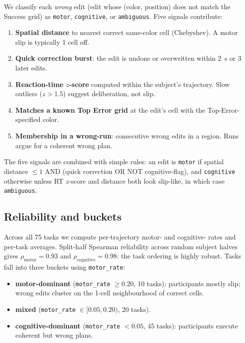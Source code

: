 \documentclass[11pt]{article}
\begin{document}
We classify each \emph{wrong} edit (edit whose (color, position)
does not match the Success grid) as \texttt{motor},
\texttt{cognitive}, or \texttt{ambiguous}. Five signals contribute:

\begin{enumerate}[leftmargin=*, topsep=2pt, itemsep=1pt]
  \item \textbf{Spatial distance} to nearest correct
        same-color cell (Chebyshev). A motor slip is typically 1
        cell off.
  \item \textbf{Quick correction burst}: the edit is undone or
        overwritten within 2~s or 3 later edits.
  \item \textbf{Reaction-time $z$-score} computed within the
        subject's trajectory. Slow outliers ($z > 1.5$) suggest
        deliberation, not slip.
  \item \textbf{Matches a known Top Error grid} at the edit's
        cell with the Top-Error-specified color.
  \item \textbf{Membership in a wrong-run}: consecutive wrong
        edits in a region. Runs argue for a coherent wrong plan.
\end{enumerate}

The five signals are combined with simple rules: an edit is
\texttt{motor} if spatial distance $\leq 1$ AND (quick correction OR
NOT cognitive-flag), and \texttt{cognitive} otherwise unless RT
$z$-score and distance both look slip-like, in which case
\texttt{ambiguous}.

\subsection{Reliability and buckets}

Across all 75 tasks we compute per-trajectory motor- and cognitive-
rates and per-task averages. Split-half Spearman reliability
across random subject halves gives $\rho_{\text{motor}} = 0.93$
and $\rho_{\text{cognitive}} = 0.98$: the task ordering is highly
robust. Tasks fall into three buckets using \texttt{motor\_rate}:

\begin{itemize}[leftmargin=*, topsep=2pt, itemsep=1pt]
  \item \textbf{motor-dominant} (\texttt{motor\_rate} $\geq 0.20$,
        10 tasks): participants mostly slip; wrong edits cluster on
        the 1-cell neighbourhood of correct cells.
  \item \textbf{mixed} (\texttt{motor\_rate} $\in [0.05, 0.20)$,
        20 tasks).
  \item \textbf{cognitive-dominant} (\texttt{motor\_rate} $< 0.05$,
        45 tasks): participants execute coherent but wrong plans.
\end{itemize}
\end{document}
